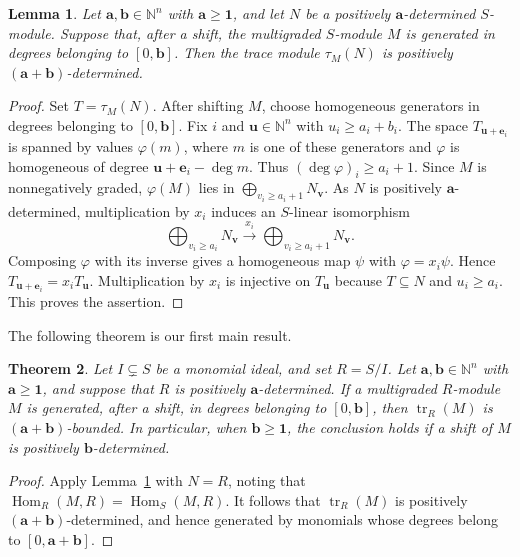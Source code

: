 \documentclass[a4paper,11pt]{amsart}
\theoremstyle{plain}
\newtheorem{theorem}{Theorem}[section]
\newtheorem{lemma}[theorem]{Lemma}
\theoremstyle{definition}
\theoremstyle{remark}
\DeclareMathOperator{\tr}{tr}
\DeclareMathOperator{\Hom}{Hom}
\newcommand{\NN}{\mathbb N}
\newcommand{\ee}{\mathbf e}
\newcommand{\one}{\mathbf1}
\begin{document}
\begin{lemma}\label{lem:images-bound}
Let $\mathbf{a},\mathbf{b}\in\NN^n$ with $\mathbf{a}\geq\one$, and let $N$ be a positively $\mathbf{a}$-determined $S$-module. Suppose that, after a shift, the multigraded $S$-module $M$ is generated in degrees belonging to $[0,\mathbf{b}]$. Then the trace module $\tau_M(N)$ is positively $(\mathbf{a}+\mathbf{b})$-determined.
\end{lemma}
\begin{proof}
Set $T=\tau_M(N)$. After shifting $M$, choose homogeneous generators in degrees belonging to $[0,\mathbf{b}]$. Fix $i$ and $\mathbf{u}\in\NN^n$ with $u_i\geq a_i+b_i$. The space $T_{\mathbf{u}+\ee_i}$ is spanned by values $\varphi(m)$, where $m$ is one of these generators and $\varphi$ is homogeneous of degree $\mathbf{u}+\ee_i-\deg m$. Thus $(\deg\varphi)_i\geq a_i+1$. Since $M$ is nonnegatively graded, $\varphi(M)$ lies in $\bigoplus_{v_i\geq a_i+1}N_{\mathbf{v}}$. As $N$ is positively $\mathbf{a}$-determined, multiplication by $x_i$ induces an $S$-linear isomorphism
\[
\bigoplus_{v_i\geq a_i}N_{\mathbf{v}}\xrightarrow{\ x_i\ }\bigoplus_{v_i\geq a_i+1}N_{\mathbf{v}}.
\]
Composing $\varphi$ with its inverse gives a homogeneous map $\psi$ with $\varphi=x_i\psi$. Hence $T_{\mathbf{u}+\ee_i}=x_iT_{\mathbf{u}}$. Multiplication by $x_i$ is injective on $T_{\mathbf{u}}$ because $T\subseteq N$ and $u_i\geq a_i$. This proves the assertion.
\end{proof}

The following theorem is our first main result.

\begin{theorem}\label{thm:cube-free}
Let $I\subsetneq S$ be a monomial ideal, and set $R=S/I$. Let $\mathbf{a},\mathbf{b}\in\NN^n$ with $\mathbf{a}\geq\one$, and suppose that $R$ is positively $\mathbf{a}$-determined. If a multigraded $R$-module $M$ is generated, after a shift, in degrees belonging to $[0,\mathbf{b}]$, then $\tr_R(M)$ is $(\mathbf{a}+\mathbf{b})$-bounded. In particular, when $\mathbf{b}\geq\one$, the conclusion holds if a shift of $M$ is positively $\mathbf{b}$-determined.
\end{theorem}
\begin{proof}
Apply Lemma~\ref{lem:images-bound} with $N=R$, noting that $\Hom_R(M,R)=\Hom_S(M,R)$. It follows that $\tr_R(M)$ is positively $(\mathbf{a}+\mathbf{b})$-determined, and hence generated by monomials whose degrees belong to $[0,\mathbf{a}+\mathbf{b}]$.
\end{proof}
\end{document}
